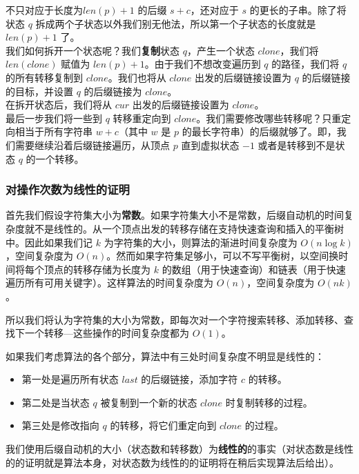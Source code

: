 \begin{itemize}
  不只对应于长度为\(len(p)+1\) 的后缀 \(s+c\)，还对应于 \(s\)
  的更长的子串。除了将状态 \(q\)
  拆成两个子状态以外我们别无他法，所以第一个子状态的长度就是
  \(len(p)+1\) 了。\\
  我们如何拆开一个状态呢？我们\textbf{复制}状态 \(q\)，产生一个状态
  \(clone\)，我们将 \(len(clone)\) 赋值为
  \(len(p)+1\)。由于我们不想改变遍历到 \(q\) 的路径，我们将 \(q\)
  的所有转移复制到 \(clone\)。我们也将从 \(clone\) 出发的后缀链接设置为
  \(q\) 的后缀链接的目标，并设置 \(q\) 的后缀链接为 \(clone\)。\\
  在拆开状态后，我们将从 \(cur\) 出发的后缀链接设置为 \(clone\)。\\
  最后一步我们将一些到 \(q\) 转移重定向到
  \(clone\)。我们需要修改哪些转移呢？只重定向相当于所有字符串
  \(w+c\)（其中 \(w\) 是 \(p\)
  的最长字符串）的后缀就够了。即，我们需要继续沿着后缀链接遍历，从顶点
  \(p\) 直到虚拟状态 \(-1\) 或者是转移到不是状态 \(q\) 的一个转移。
\end{itemize}

\subsubsection{对操作次数为线性的证明}

首先我们假设字符集大小为\textbf{常数}。如果字符集大小不是常数，后缀自动机的时间复杂度就不是线性的。从一个顶点出发的转移存储在支持快速查询和插入的平衡树中。因此如果我们记
\(k\) 为字符集的大小，则算法的渐进时间复杂度为
\(O(n\log k)\)，空间复杂度为
\(O(n)\)。然而如果字符集足够小，可以不写平衡树，以空间换时间将每个顶点的转移存储为长度为
\(k\)
的数组（用于快速查询）和链表（用于快速遍历所有可用关键字）。这样算法的时间复杂度为
\(O(n)\)，空间复杂度为 \(O(nk)\)。

所以我们将认为字符集的大小为常数，即每次对一个字符搜索转移、添加转移、查找下一个转移---这些操作的时间复杂度都为
\(O(1)\)。

如果我们考虑算法的各个部分，算法中有三处时间复杂度不明显是线性的：
\begin{itemize}
\item
  第一处是遍历所有状态 \(last\) 的后缀链接，添加字符 \(c\) 的转移。
\item
  第二处是当状态 \(q\) 被复制到一个新的状态 \(clone\) 时复制转移的过程。
\item
  第三处是修改指向 \(q\) 的转移，将它们重定向到 \(clone\) 的过程。
\end{itemize}

我们使用后缀自动机的大小（状态数和转移数）为\textbf{线性的}的事实（对状态数是线性的的证明就是算法本身，对状态数为线性的的证明将在稍后实现算法后给出）。

